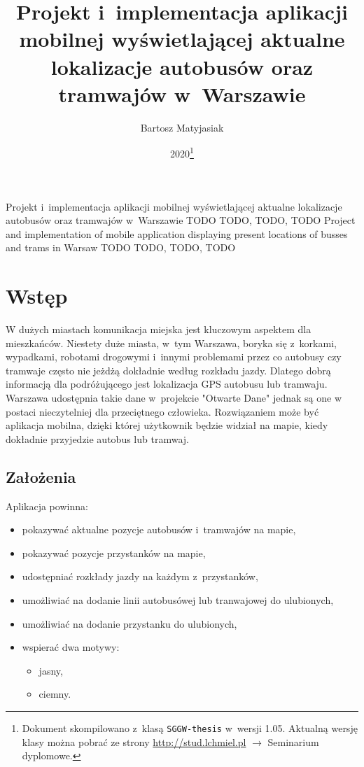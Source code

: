 \documentclass{SGGW-thesis}
\title{Projekt i~implementacja aplikacji mobilnej wyświetlającej aktualne lokalizacje autobusów oraz tramwajów w~Warszawie}
\author{Bartosz Matyjasiak}
\date{2020\footnote{Dokument skompilowano z~klasą {\tt SGGW-thesis} w~wersji 1.05. Aktualną wersję klasy można pobrać ze strony \url{http://stud.lchmiel.pl} $\rightarrow$ Seminarium dyplomowe.}}
\begin{document}
\maketitle
\statementpage
\abstractpage
{Projekt i~implementacja aplikacji mobilnej wyświetlającej aktualne lokalizacje autobusów oraz tramwajów w~Warszawie}
{TODO}
{TODO, TODO, TODO}
{Project and implementation of mobile application displaying present locations of busses and trams in Warsaw}
{TODO}
{TODO, TODO, TODO}


{
  \doublespacing
  \tableofcontents
}

\startchapterfromoddpage %


\chapter{Wstęp}
W dużych miastach komunikacja miejska jest kluczowym aspektem dla mieszkańców.
Niestety duże miasta, w~tym Warszawa, boryka się z~korkami, wypadkami, robotami drogowymi i~innymi problemami przez
co autobusy czy tramwaje często nie jeżdżą dokładnie według rozkładu jazdy.
Dlatego dobrą informacją dla podróżującego jest lokalizacja GPS autobusu lub tramwaju.
Warszawa udostępnia takie dane w~projekcie "Otwarte Dane" \cite{APIWARSZAWA} jednak są one w postaci nieczytelniej dla przeciętnego człowieka.
Rozwiązaniem może być aplikacja mobilna, dzięki której użytkownik będzie widział na mapie, kiedy dokładnie przyjedzie autobus lub tramwaj.
\section{Założenia}
Aplikacja powinna:
\label{ZALOZENIA}
\begin{itemize}
  \item{pokazywać aktualne pozycje autobusów i~tramwajów na mapie,}
  \item{pokazywać pozycje przystanków na mapie,}
  \item{udostępniać rozkłady jazdy na każdym z~przystanków,}
  \item{umożliwiać na dodanie linii autobusówej lub tranwajowej do ulubionych,}
  \item{umożliwiać na dodanie przystanku do ulubionych,}
  \item{wspierać dwa motywy:}
  \begin{itemize}
    \item{jasny,}
    \item{ciemny.}
  \end{itemize}
\end{itemize}
\vfill
\pagebreak
\end{document}
